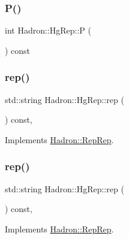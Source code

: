 \subsubsection{\texorpdfstring{P()}{P()}}
{\footnotesize\ttfamily int Hadron\+::\+Hg\+Rep\+::P (\begin{DoxyParamCaption}{ }\end{DoxyParamCaption}) const\hspace{0.3cm}{\ttfamily [inline]}}

\mbox{\label{structHadron_1_1HgRep_a229b19e7f1d4fa443b715de9b5ed4454}} 
\subsubsection{\texorpdfstring{rep()}{rep()}\hspace{0.1cm}{\footnotesize\ttfamily [1/3]}}
{\footnotesize\ttfamily std\+::string Hadron\+::\+Hg\+Rep\+::rep (\begin{DoxyParamCaption}{ }\end{DoxyParamCaption}) const\hspace{0.3cm}{\ttfamily [inline]}, {\ttfamily [virtual]}}



Implements \mbox{\hyperlink{structHadron_1_1RepRep_ab3213025f6de249f7095892109575fde}{Hadron\+::\+Rep\+Rep}}.

\mbox{\label{structHadron_1_1HgRep_a229b19e7f1d4fa443b715de9b5ed4454}} 
\subsubsection{\texorpdfstring{rep()}{rep()}\hspace{0.1cm}{\footnotesize\ttfamily [2/3]}}
{\footnotesize\ttfamily std\+::string Hadron\+::\+Hg\+Rep\+::rep (\begin{DoxyParamCaption}{ }\end{DoxyParamCaption}) const\hspace{0.3cm}{\ttfamily [inline]}, {\ttfamily [virtual]}}



Implements \mbox{\hyperlink{structHadron_1_1RepRep_ab3213025f6de249f7095892109575fde}{Hadron\+::\+Rep\+Rep}}.

